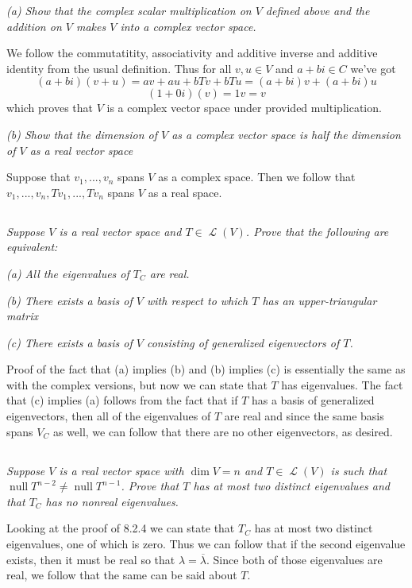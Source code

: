 \documentclass[11pt,oneside,titlepage]{book}
\DeclareMathOperator \map {\mathcal {L}}
\DeclareMathOperator \ns {null}
\begin{document}
\textit{(a) Show that the complex scalar multiplication on $V$ defined above and the addition
  on $V$ makes $V$ into a complex vector space.}

We follow the commutatitity, associativity and additive inverse and additive identity from
the usual definition. Thus for all $v, u \in V$ and $a + bi \in C$ we've got
$$(a + bi)(v + u) = a v + au + bTv  + bTu = (a + bi)v + (a + bi)u$$
$$(1 + 0i)(v) = 1v = v$$
which proves that $V$ is a complex vector space under provided multiplication.

\textit{(b) Show that the dimension of $V$ as a complex vector space is
  half the dimension of $V$ as a real vector space}

Suppose that $v_1, ..., v_n$ spans $V$ as a complex space. Then we follow that
$v_1, ..., v_n, Tv_1, ..., Tv_n$ spans $V$ as a real space.

\subsection{}

\textit{Suppose $V$ is a real vector space and $T \in \map(V)$. Prove that the following
  are equivalent: }

\textit{(a) All the eigenvalues of $T_C$ are real.}

\textit{(b) There exists a basis of $V$ with respect to which $T$ has an upper-triangular
  matrix}

\textit{(c) There exists a basis of $V$ consisting of generalized eigenvectors of $T$.}

Proof of the fact that (a) implies (b) and (b) implies (c) is essentially the same as with the
complex versions, but now we can state that $T$ has eigenvalues.
The fact that (c) implies (a) follows from the fact that if $T$ has a basis of generalized
eigenvectors, then all of the eigenvalues of $T$ are real and since the same basis spans $V_C$
as well, we can follow that there are no other eigenvectors, as desired.

\subsection{}

\textit{Suppose $V$ is a real vector space with $\dim V = n$ and $T \in \map(V)$
  is such that $\ns T^{n - 2} \neq \ns T^{n - 1}$. Prove that $T$ has at most
  two distinct eigenvalues and that $T_C$ has no nonreal eigenvalues.}


Looking at the proof of 8.2.4 we can state that $T_C$ has at most two distinct eigenvalues,
one of which is zero. Thus we can follow that if the second eigenvalue  exists, then it must
be real so that $\lambda = \overline{\lambda}$. Since both of those eigenvalues are real, we
follow that the same can be said about $T$.
\end{document}
